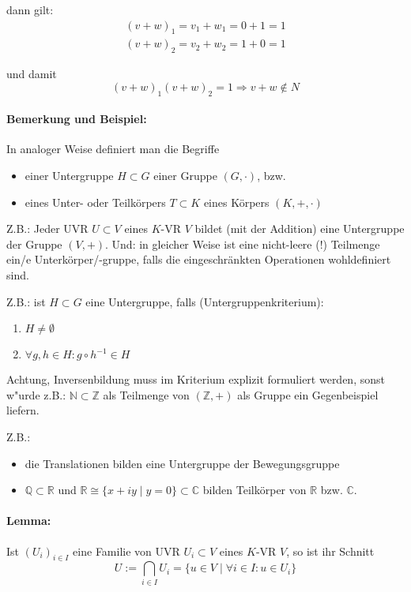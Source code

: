 	dann gilt:
	\begin{gather*}
		(v+w)_1 = v_1 + w_1 = 0+1=1\\
		(v+w)_2 = v_2 + w_2 = 1+0 = 1
	\end{gather*}

	und damit
	\begin{equation*}
		(v+w)_1(v+w)_2 = 1 \Rightarrow v+w\notin N
	\end{equation*}

\paragraph{Bemerkung und Beispiel:}
	In analoger Weise definiert man die Begriffe
	\begin{itemize}
		\item einer Untergruppe $H\subset G$ einer Gruppe $(G,\cdot)$, bzw.
		\item eines Unter- oder Teilkörpers $T\subset K$ eines Körpers $(K,+,\cdot )$
	\end{itemize}
	
	Z.B.: Jeder UVR $U\subset V$ eines $K$-VR $V$ bildet (mit der Addition) eine Untergruppe der Gruppe $(V,+)$.
    Und: in gleicher Weise ist eine nicht-leere (!) Teilmenge ein/e Unterkörper/-gruppe, falls die eingeschränkten Operationen wohldefiniert sind.
    
    Z.B.: ist $H\subset G$ eine Untergruppe, falls (Untergruppenkriterium):
    \begin{enumerate}
        \item $H\neq \emptyset$
        \item $\forall g,h\in H: g\circ h^{-1} \in H$
    \end{enumerate}
            
	Achtung, Inversenbildung muss im Kriterium explizit formuliert werden, sonst w"urde z.B.: $\mathbb{N}\subset\mathbb{Z}$ als Teilmenge von $(\mathbb{Z}, +)$ als Gruppe ein Gegenbeispiel liefern.
            
     Z.B.: 
     \begin{itemize}
        \item die Translationen bilden eine Untergruppe der Bewegungsgruppe
        \item $\mathbb{Q}\subset\mathbb{R}$ und $\mathbb{R}\cong \{x+iy\mid y=0\}\subset\mathbb{C}$ bilden Teilkörper von $\mathbb{R}$ bzw. $\mathbb{C}$.
     \end{itemize}

\paragraph{Lemma:}
    Ist $(U_i)_{i\in I}$ eine Familie von UVR $U_i\subset V$ eines $K$-VR $V$, so ist ihr Schnitt
        \begin{equation}
            U:= \bigcap_{i\in I}U_i =\{ u\in V\mid \forall i\in I: u\in U_i\}
        \end{equation}

